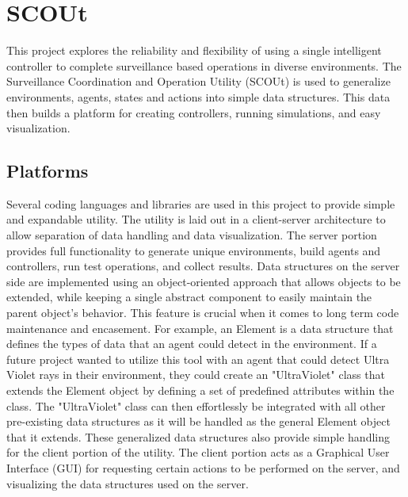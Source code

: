 

\chapter{SCOUt}
This project explores the reliability and flexibility of using a single intelligent controller to complete surveillance based operations in diverse environments.
The Surveillance Coordination and Operation Utility (SCOUt) is used to generalize environments, agents, states and actions into simple data structures.
This data then builds a platform for creating controllers, running simulations, and easy visualization.





\section{Platforms}
Several coding languages and libraries are used in this project to provide simple and expandable utility.
The utility is laid out in a client-server architecture to allow separation of data handling and data visualization.
The server portion provides full functionality to generate unique environments, build agents and controllers, run test operations, and collect results.
Data structures on the server side are implemented using an object-oriented approach that allows objects to be extended, while keeping a single abstract component to easily maintain the parent object's behavior.
This feature is crucial when it comes to long term code maintenance and encasement.
For example, an Element is a data structure that defines the types of data that an agent could detect in the environment.
If a future project wanted to utilize this tool with an agent that could detect Ultra Violet rays in their environment, they could create an "UltraViolet" class that extends the Element object by defining a set of predefined attributes within the class.
The "UltraViolet" class can then effortlessly be integrated with all other pre-existing data structures as it will be handled as the general Element object that it extends.
These generalized data structures also provide simple handling for the client portion of the utility.
The client portion acts as a Graphical User Interface (GUI) for requesting certain actions to be performed on the server, and visualizing the data structures used on the server.


